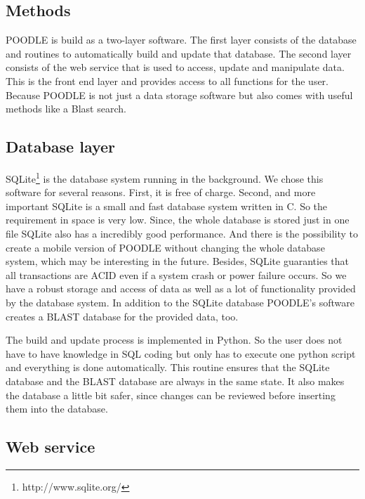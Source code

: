 \documentclass{bioinfo}
\begin{document}
\begin{methods}
\section{Methods}

POODLE is build as a two-layer software. The first layer consists of the database and routines to 
automatically build and update that database. The second layer consists of the web service that is 
used to access, update and manipulate data. This is the front end layer and provides access to all 
functions for the user. Because POODLE is not just a data storage software but also comes with useful 
methods like a Blast search.

\subsection{Database layer}

SQLite\footnote{http://www.sqlite.org/} is the database system running in the background. We chose 
this software for several reasons. First, it is free of charge. Second, and more important SQLite is 
a small and fast database system written in C. So the requirement in space is very low. Since, the 
whole database is stored just in one file SQLite also has a incredibly good performance. And there 
is the possibility to create a mobile version of POODLE without changing the whole database system, 
which may be interesting in the future. Besides, 
SQLite guaranties that all transactions are ACID even if a system crash or power failure occurs. So 
we have a robust storage and access of data as well as a lot of functionality provided by the database 
system. In addition to the SQLite database POODLE's software creates a BLAST database for the provided 
data, too. 

The build and update process is implemented in Python. So the user does not have to have knowledge in 
SQL coding but only has to execute one python script and everything is done automatically. This routine 
ensures that the SQLite database and the BLAST database are always in the same state. It also makes 
the database a little bit safer, since changes can be reviewed before inserting them into the database.

\subsection{Web service}


\end{methods}
\end{document}
